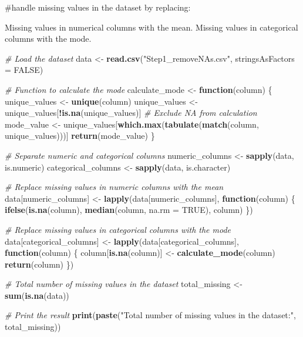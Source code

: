 \documentclass[
]{article}
\newenvironment{Shaded}{\begin{snugshade}}{\end{snugshade}}
\newcommand{\AttributeTok}[1]{\textcolor[rgb]{0.13,0.29,0.53}{#1}}
\newcommand{\CommentTok}[1]{\textcolor[rgb]{0.56,0.35,0.01}{\textit{#1}}}
\newcommand{\ConstantTok}[1]{\textcolor[rgb]{0.56,0.35,0.01}{#1}}
\newcommand{\ControlFlowTok}[1]{\textcolor[rgb]{0.13,0.29,0.53}{\textbf{#1}}}
\newcommand{\FunctionTok}[1]{\textcolor[rgb]{0.13,0.29,0.53}{\textbf{#1}}}
\newcommand{\NormalTok}[1]{#1}
\newcommand{\OtherTok}[1]{\textcolor[rgb]{0.56,0.35,0.01}{#1}}
\newcommand{\SpecialCharTok}[1]{\textcolor[rgb]{0.81,0.36,0.00}{\textbf{#1}}}
\newcommand{\StringTok}[1]{\textcolor[rgb]{0.31,0.60,0.02}{#1}}
\begin{document}
\#handle missing values in the dataset by replacing:

Missing values in numerical columns with the mean. Missing values in
categorical columns with the mode.

\begin{Shaded}
\begin{Highlighting}[]
\CommentTok{\# Load the dataset}
\NormalTok{data }\OtherTok{\textless{}{-}} \FunctionTok{read.csv}\NormalTok{(}\StringTok{"Step1\_removeNAs.csv"}\NormalTok{, }\AttributeTok{stringsAsFactors =} \ConstantTok{FALSE}\NormalTok{)}

\CommentTok{\# Function to calculate the mode}
\NormalTok{calculate\_mode }\OtherTok{\textless{}{-}} \ControlFlowTok{function}\NormalTok{(column) \{}
\NormalTok{  unique\_values }\OtherTok{\textless{}{-}} \FunctionTok{unique}\NormalTok{(column)}
\NormalTok{  unique\_values }\OtherTok{\textless{}{-}}\NormalTok{ unique\_values[}\SpecialCharTok{!}\FunctionTok{is.na}\NormalTok{(unique\_values)]  }\CommentTok{\# Exclude NA from calculation}
\NormalTok{  mode\_value }\OtherTok{\textless{}{-}}\NormalTok{ unique\_values[}\FunctionTok{which.max}\NormalTok{(}\FunctionTok{tabulate}\NormalTok{(}\FunctionTok{match}\NormalTok{(column, unique\_values)))]}
  \FunctionTok{return}\NormalTok{(mode\_value)}
\NormalTok{\}}

\CommentTok{\# Separate numeric and categorical columns}
\NormalTok{numeric\_columns }\OtherTok{\textless{}{-}} \FunctionTok{sapply}\NormalTok{(data, is.numeric)}
\NormalTok{categorical\_columns }\OtherTok{\textless{}{-}} \FunctionTok{sapply}\NormalTok{(data, is.character)}

\CommentTok{\# Replace missing values in numeric columns with the mean}
\NormalTok{data[numeric\_columns] }\OtherTok{\textless{}{-}} \FunctionTok{lapply}\NormalTok{(data[numeric\_columns], }\ControlFlowTok{function}\NormalTok{(column) \{}
  \FunctionTok{ifelse}\NormalTok{(}\FunctionTok{is.na}\NormalTok{(column), }\FunctionTok{median}\NormalTok{(column, }\AttributeTok{na.rm =} \ConstantTok{TRUE}\NormalTok{), column)}
\NormalTok{\})}

\CommentTok{\# Replace missing values in categorical columns with the mode}
\NormalTok{data[categorical\_columns] }\OtherTok{\textless{}{-}} \FunctionTok{lapply}\NormalTok{(data[categorical\_columns], }\ControlFlowTok{function}\NormalTok{(column) \{}
\NormalTok{  column[}\FunctionTok{is.na}\NormalTok{(column)] }\OtherTok{\textless{}{-}} \FunctionTok{calculate\_mode}\NormalTok{(column)}
  \FunctionTok{return}\NormalTok{(column)}
\NormalTok{\})}

\CommentTok{\# Total number of missing values in the dataset}
\NormalTok{total\_missing }\OtherTok{\textless{}{-}} \FunctionTok{sum}\NormalTok{(}\FunctionTok{is.na}\NormalTok{(data))}

\CommentTok{\# Print the result}
\FunctionTok{print}\NormalTok{(}\FunctionTok{paste}\NormalTok{(}\StringTok{"Total number of missing values in the dataset:"}\NormalTok{, total\_missing))}
\end{Highlighting}
\end{Shaded}
\end{document}
